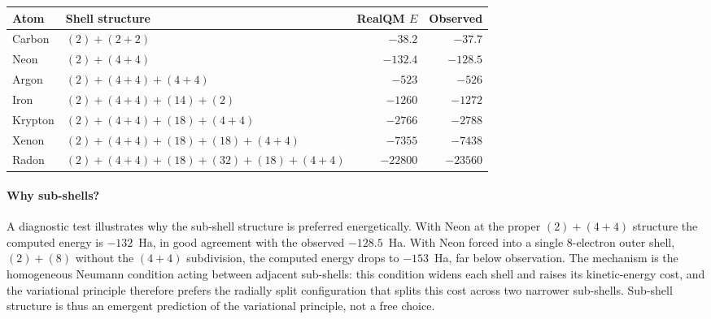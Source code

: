 \documentclass[11pt]{article}
\begin{document}
\begin{center}\small
\renewcommand{\arraystretch}{1.05}
\begin{tabular}{l l r r}
\toprule
\textbf{Atom} & \textbf{Shell structure} & \textbf{RealQM $E$} & \textbf{Observed} \\
\midrule
Carbon   & $(2) + (2{+}2)$                                  & $-38.2$    & $-37.7$    \\
Neon     & $(2) + (4{+}4)$                                  & $-132.4$   & $-128.5$   \\
Argon    & $(2) + (4{+}4) + (4{+}4)$                        & $-523$     & $-526$     \\
Iron     & $(2) + (4{+}4) + (14) + (2)$                     & $-1260$    & $-1272$    \\
Krypton  & $(2) + (4{+}4) + (18) + (4{+}4)$                 & $-2766$    & $-2788$    \\
Xenon    & $(2) + (4{+}4) + (18) + (18) + (4{+}4)$          & $-7355$    & $-7438$    \\
Radon    & $(2) + (4{+}4) + (18) + (32) + (18) + (4{+}4)$   & $-22800$   & $-23560$   \\
\bottomrule
\end{tabular}
\end{center}

\paragraph{Why sub-shells?}
A diagnostic test illustrates why the sub-shell structure is preferred energetically. With Neon at the proper $(2) + (4{+}4)$ structure the computed energy is $-132$~Ha, in good agreement with the observed $-128.5$~Ha. With Neon forced into a single $8$-electron outer shell, $(2) + (8)$ without the $(4{+}4)$ subdivision, the computed energy drops to $-153$~Ha, far below observation. The mechanism is the homogeneous Neumann condition acting between adjacent sub-shells: this condition widens each shell and raises its kinetic-energy cost, and the variational principle therefore prefers the radially split configuration that splits this cost across two narrower sub-shells. Sub-shell structure is thus an emergent prediction of the variational principle, not a free choice.
\end{document}
